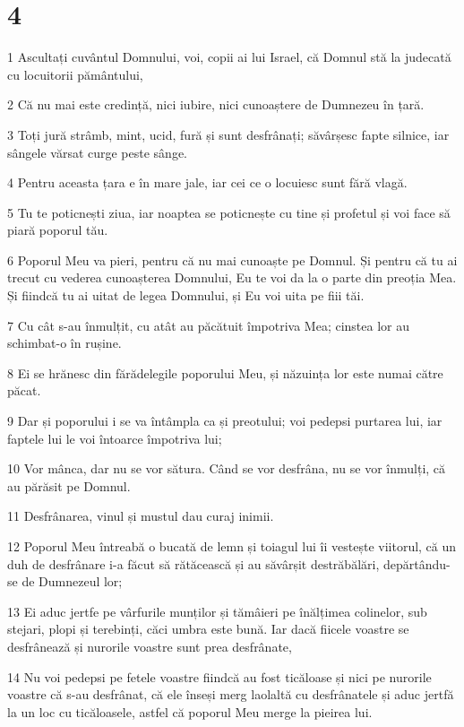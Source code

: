 \chapter{4}

\par 1 Ascultați cuvântul Domnului, voi, copii ai lui Israel, că Domnul stă la judecată cu locuitorii pământului,
\par 2 Că nu mai este credință, nici iubire, nici cunoaștere de Dumnezeu în țară.
\par 3 Toți jură strâmb, mint, ucid, fură și sunt desfrânați; săvârșesc fapte silnice, iar sângele vărsat curge peste sânge.
\par 4 Pentru aceasta țara e în mare jale, iar cei ce o locuiesc sunt fără vlagă.
\par 5 Tu te poticnești ziua, iar noaptea se poticnește cu tine și profetul și voi face să piară poporul tău.
\par 6 Poporul Meu va pieri, pentru că nu mai cunoaște pe Domnul. Și pentru că tu ai trecut cu vederea cunoașterea Domnului, Eu te voi da la o parte din preoția Mea. Și fiindcă tu ai uitat de legea Domnului, și Eu voi uita pe fiii tăi.
\par 7 Cu cât s-au înmulțit, cu atât au păcătuit împotriva Mea; cinstea lor au schimbat-o în rușine.
\par 8 Ei se hrănesc din fărădelegile poporului Meu, și năzuința lor este numai către păcat.
\par 9 Dar și poporului i se va întâmpla ca și preotului; voi pedepsi purtarea lui, iar faptele lui le voi întoarce împotriva lui;
\par 10 Vor mânca, dar nu se vor sătura. Când se vor desfrâna, nu se vor înmulți, că au părăsit pe Domnul.
\par 11 Desfrânarea, vinul și mustul dau curaj inimii.
\par 12 Poporul Meu întreabă o bucată de lemn și toiagul lui îi vestește viitorul, că un duh de desfrânare i-a făcut să rătăcească și au săvârșit destrăbălări, depărtându-se de Dumnezeul lor;
\par 13 Ei aduc jertfe pe vârfurile munților și tămâieri pe înălțimea colinelor, sub stejari, plopi și terebinți, căci umbra este bună. Iar dacă fiicele voastre se desfrânează și nurorile voastre sunt prea desfrânate,
\par 14 Nu voi pedepsi pe fetele voastre fiindcă au fost ticăloase și nici pe nurorile voastre că s-au desfrânat, că ele înseși merg laolaltă cu desfrânatele și aduc jertfă la un loc cu ticăloasele, astfel că poporul Meu merge la pieirea lui.
